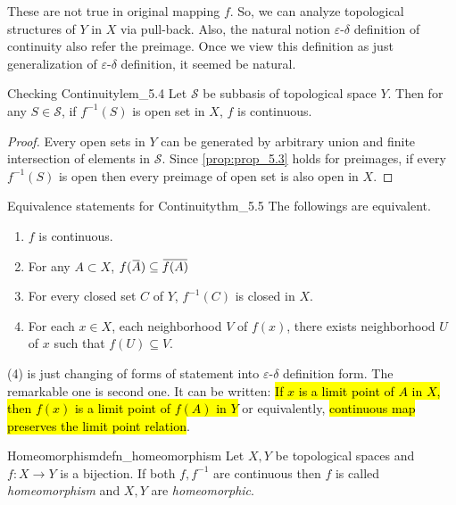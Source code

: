 \documentclass[12pt, a4paper, twoside]{article}
\newcommand{\overbar}[1]{\mkern 1.5mu\overline{\mkern-1.5mu#1\mkern-1.5mu}\mkern 1.5mu}
\newcommand{\CS}{{\mathcal {S}}} \newcommand{\CT}{{\mathcal {T}}}
\theoremstyle{plain}
\begin{document}
These are not true in original mapping $f$. So, we can analyze topological structures of $Y$ in $X$ via pull-back. 
Also, the natural notion $\varepsilon$-$\delta$ definition of continuity also refer the preimage. 
Once we view this definition as just generalization of $\varepsilon$-$\delta$ definition, it seemed be natural. 

\begin{lem}{Checking Continuity}{lem_5.4}
    Let $\CS$ be subbasis of topological space $Y$. Then for any $S \in \CS$, if $f^{-1}(S)$ is open set in $X$, $f$ is continuous. 
\end{lem}

\begin{proof}
    Every open sets in $Y$ can be generated by arbitrary union and finite intersection of elements in $\CS$. 
    Since \ref{prop:prop_5.3} holds for preimages, if every $f^{-1}(S)$ is open then every preimage of open set is also open in $X$. 
\end{proof}

\newpage 

\begin{thm}{Equivalence statements for Continuity}{thm_5.5}
    The followings are equivalent. 
    \begin{enumerate}
        \item $f$ is continuous.
        \item For any $A \subset X$, $f(\overbar{A}) \subseteq \overbar{f(A)}$
        \item For every closed set $C$ of $Y$, $f^{-1}(C)$ is closed in $X$. 
        \item For each $x \in X$, each neighborhood $V$ of $f(x)$, there exists neighborhood $U$ of $x$ such that $f(U) \subseteq V$. 
    \end{enumerate}
\end{thm}
(4) is just changing of forms of statement into $\varepsilon$-$\delta$ definition form. 
The remarkable one is second one. It can be written: \hl{If $x$ is a limit point of $A$ in $X$, then $f(x)$ is a limit point of $f(A)$ in $Y$} or equivalently, 
\hl{continuous map preserves the limit point relation}. 

\begin{defn}{Homeomorphism}{defn_homeomorphism}
    Let $X, Y$ be topological spaces and $f: X \rightarrow Y$ is a bijection. If both $f, f^{-1}$ are continuous 
    then $f$ is called \textit{homeomorphism} and $X, Y$ are \textit{homeomorphic}. 
\end{defn}
\end{document}

